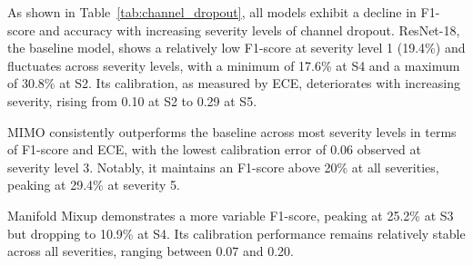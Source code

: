 \begin{table}[htbp]
\centering
{} %
\caption[Classification and calibration performance under channel dropout]{Classification and calibration performance under channel dropout corruption at severity levels 1 to 5. S1–S5 denote severity levels.}
\label{tab:channel_dropout}
\end{table}

As shown in Table~\ref{tab:channel_dropout}, all models exhibit a decline in F1-score and accuracy with increasing severity levels of channel dropout. ResNet-18, the baseline model, shows a relatively low F1-score at severity level 1 (19.4\%) and fluctuates across severity levels, with a minimum of 17.6\% at S4 and a maximum of 30.8\% at S2. Its calibration, as measured by ECE, deteriorates with increasing severity, rising from 0.10 at S2 to 0.29 at S5.

MIMO consistently outperforms the baseline across most severity levels in terms of F1-score and ECE, with the lowest calibration error of 0.06 observed at severity level 3. Notably, it maintains an F1-score above 20\% at all severities, peaking at 29.4\% at severity 5.

Manifold Mixup demonstrates a more variable F1-score, peaking at 25.2\% at S3 but dropping to 10.9\% at S4. Its calibration performance remains relatively stable across all severities, ranging between 0.07 and 0.20.

